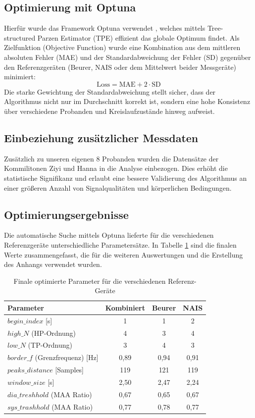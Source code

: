 \documentclass[a4paper, 11pt]{scrartcl}
\begin{document}
\subsection{Optimierung mit Optuna}
Hierfür wurde das Framework Optuna verwendet \cite{akiba2019optuna}, welches mittels Tree-structured Parzen Estimator (TPE) effizient das globale Optimum findet. Als Zielfunktion (Objective Function) wurde eine Kombination aus dem mittleren absoluten Fehler (MAE) und der Standardabweichung der Fehler (SD) gegenüber den Referenzgeräten (Beurer, NAIS oder dem Mittelwert beider Messgeräte) minimiert:
\[ \text{Loss} = \text{MAE} + 2 \cdot \text{SD} \]
Die starke Gewichtung der Standardabweichung stellt sicher, dass der Algorithmus nicht nur im Durchschnitt korrekt ist, sondern eine hohe Konsistenz über verschiedene Probanden und Kreislaufzustände hinweg aufweist.

\subsection{Einbeziehung zusätzlicher Messdaten}
Zusätzlich zu unseren eigenen 8 Probanden wurden die Datensätze der Kommilitonen Ziyi und Hanna in die Analyse einbezogen. Dies erhöht die statistische Signifikanz und erlaubt eine bessere Validierung des Algorithmus an einer größeren Anzahl von Signalqualitäten und körperlichen Bedingungen.

\subsection{Optimierungsergebnisse}
Die automatische Suche mittels Optuna lieferte für die verschiedenen Referenzgeräte unterschiedliche Parametersätze. In Tabelle \ref{tab:parameter-ergebnisse} sind die finalen Werte zusammengefasst, die für die weiteren Auswertungen und die Erstellung des Anhangs verwendet wurden.

\begin{table}[H]
\centering
\begin{tabular}{|l|c|c|c|}
\hline
\textbf{Parameter} & \textbf{Kombiniert} & \textbf{Beurer} & \textbf{NAIS} \\ \hline
$begin\_index$ [s] & 1 & 1 & 2 \\ \hline
$high\_N$ (HP-Ordnung) & 4 & 3 & 4 \\ \hline
$low\_N$ (TP-Ordnung) & 3 & 4 & 3 \\ \hline
$border\_f$ (Grenzfrequenz) [Hz] & 0,89 & 0,94 & 0,91 \\ \hline
$peaks\_distance$ [Samples] & 119 & 121 & 119 \\ \hline
$window\_size$ [s] & 2,50 & 2,47 & 2,24 \\ \hline
$dia\_treshhold$ (MAA Ratio) & 0,67 & 0,65 & 0,67 \\ \hline
$sys\_trashhold$ (MAA Ratio) & 0,77 & 0,78 & 0,77 \\ \hline
\end{tabular}
\caption{Finale optimierte Parameter für die verschiedenen Referenz-Geräte}
\label{tab:parameter-ergebnisse}
\end{table}
\end{document}
